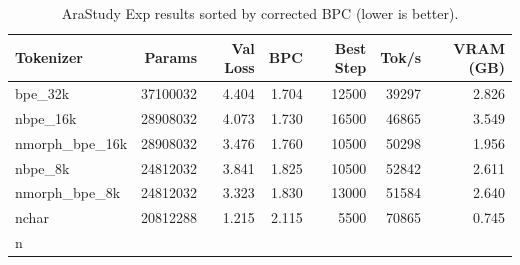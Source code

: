 \begin{table}[t]
\centering
\small
\begin{tabular}{lrrrrrr}
\toprule
Tokenizer & Params & Val Loss & BPC & Best Step & Tok/s & VRAM (GB) \\
\midrule
bpe_32k & 37100032 & 4.404 & 1.704 & 12500 & 39297 & 2.826 \\nbpe_16k & 28908032 & 4.073 & 1.730 & 16500 & 46865 & 3.549 \\nmorph_bpe_16k & 28908032 & 3.476 & 1.760 & 10500 & 50298 & 1.956 \\nbpe_8k & 24812032 & 3.841 & 1.825 & 10500 & 52842 & 2.611 \\nmorph_bpe_8k & 24812032 & 3.323 & 1.830 & 13000 & 51584 & 2.640 \\nchar & 20812288 & 1.215 & 2.115 & 5500 & 70865 & 0.745 \\n\bottomrule
\end{tabular}
\caption{AraStudy Exp results sorted by corrected BPC (lower is better).}
\label{tab:arastudy-exp-results}
\end{table}
